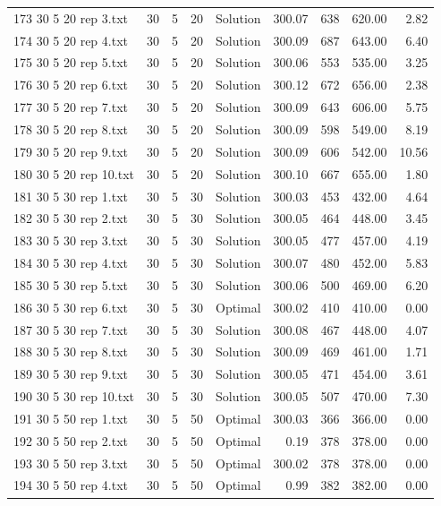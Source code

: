 \begin{longtable}{lrrllrrrr}
173 30 5 20 rep 3.txt & 30 & 5 & 20 & Solution & 300.07 & 638 & 620.00 &  2.82\\
174 30 5 20 rep 4.txt & 30 & 5 & 20 & Solution & 300.09 & 687 & 643.00 &  6.40\\
175 30 5 20 rep 5.txt & 30 & 5 & 20 & Solution & 300.06 & 553 & 535.00 &  3.25\\
176 30 5 20 rep 6.txt & 30 & 5 & 20 & Solution & 300.12 & 672 & 656.00 &  2.38\\
177 30 5 20 rep 7.txt & 30 & 5 & 20 & Solution & 300.09 & 643 & 606.00 &  5.75\\
178 30 5 20 rep 8.txt & 30 & 5 & 20 & Solution & 300.09 & 598 & 549.00 &  8.19\\
179 30 5 20 rep 9.txt & 30 & 5 & 20 & Solution & 300.09 & 606 & 542.00 & 10.56\\
180 30 5 20 rep 10.txt & 30 & 5 & 20 & Solution & 300.10 & 667 & 655.00 &  1.80\\
181 30 5 30 rep 1.txt & 30 & 5 & 30 & Solution & 300.03 & 453 & 432.00 &  4.64\\
182 30 5 30 rep 2.txt & 30 & 5 & 30 & Solution & 300.05 & 464 & 448.00 &  3.45\\
183 30 5 30 rep 3.txt & 30 & 5 & 30 & Solution & 300.05 & 477 & 457.00 &  4.19\\
184 30 5 30 rep 4.txt & 30 & 5 & 30 & Solution & 300.07 & 480 & 452.00 &  5.83\\
185 30 5 30 rep 5.txt & 30 & 5 & 30 & Solution & 300.06 & 500 & 469.00 &  6.20\\
186 30 5 30 rep 6.txt & 30 & 5 & 30 & Optimal & 300.02 & 410 & 410.00 &  0.00\\
187 30 5 30 rep 7.txt & 30 & 5 & 30 & Solution & 300.08 & 467 & 448.00 &  4.07\\
188 30 5 30 rep 8.txt & 30 & 5 & 30 & Solution & 300.09 & 469 & 461.00 &  1.71\\
189 30 5 30 rep 9.txt & 30 & 5 & 30 & Solution & 300.05 & 471 & 454.00 &  3.61\\
190 30 5 30 rep 10.txt & 30 & 5 & 30 & Solution & 300.05 & 507 & 470.00 &  7.30\\
191 30 5 50 rep 1.txt & 30 & 5 & 50 & Optimal & 300.03 & 366 & 366.00 &  0.00\\
192 30 5 50 rep 2.txt & 30 & 5 & 50 & Optimal &  0.19 & 378 & 378.00 &  0.00\\
193 30 5 50 rep 3.txt & 30 & 5 & 50 & Optimal & 300.02 & 378 & 378.00 &  0.00\\
194 30 5 50 rep 4.txt & 30 & 5 & 50 & Optimal &  0.99 & 382 & 382.00 &  0.00\\

\end{longtable}
